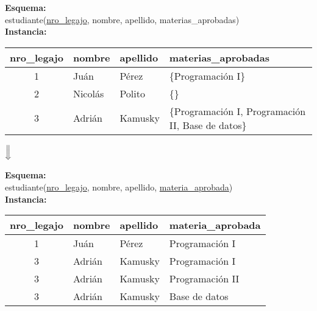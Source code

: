 \documentclass[preview]{standalone}
\begin{document}
\textbf{Esquema:}\\
estudiante(\underline{nro\_legajo}, nombre, apellido, materias\_aprobadas)\\

\textbf{Instancia:}
\begin{center}
\begin{tabular}{| c | l | l | l |}\hline			
	nro\_legajo & nombre & apellido & materias\_aprobadas \\\hline			
	1 & Ju\'an & P\'erez & \{\scriptsize{Programaci\'on I}\}\\
	2 & Nicol\'as & Polito & \{\}\\
	3 & Adri\'an & Kamusky & \{\scriptsize{Programaci\'on I, Programaci\'on II, Base de datos}\}\\\hline
\end{tabular}
\end{center}


\begin{center}
$\Big\Downarrow$
\end{center}
\textbf{Esquema:}\\
estudiante(\underline{nro\_legajo}, nombre, apellido, \underline{materia\_aprobada})\\

\textbf{Instancia:}
\begin{center}
\begin{tabular}{| c | l | l | l |}\hline			
	nro\_legajo & nombre & apellido & materia\_aprobada \\\hline			
	1 & Ju\'an & P\'erez & Programaci\'on I\\
	3 & Adri\'an & Kamusky & Programaci\'on I\\
	3 & Adri\'an & Kamusky & Programaci\'on II\\
	3 & Adri\'an & Kamusky & Base de datos\\\hline
\end{tabular}
\end{center}
\end{document}
